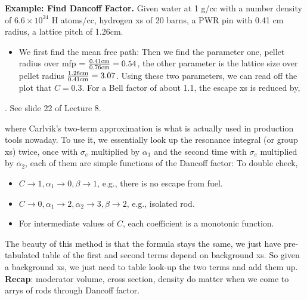 \documentclass{school-22.211-notes}
\begin{document}
\textbf{Example: Find Dancoff Factor.} Given water at 1 g/cc with a number density of $6.6 \times 10^{24}$ H atoms/cc, hydrogen xs of 20 barns, a PWR pin with 0.41 cm radius, a lattice pitch of 1.26cm. 
\begin{itemize}
\item We first find the mean free path: 
Then we find the parameter one, pellet radius over mfp = $\frac{0.41 \mathrm{cm}}{0.76 \mathrm{cm}}  = 0.54$, the other parameter is the lattice size over pellet radius $\frac{1.26 \mathrm{cm}}{0.41 \mathrm{cm}} = 3.07$. Using these two parameters, we can read off the plot that $C = 0.3$. For a Bell factor of about 1.1, the escape xs is reduced by,
\end{itemize}
. See slide 22 of Lecture 8. 


\clearpage
{}
where
Carlvik's two-term approximation is what is actually used in production tools nowaday. To use it, we essentially look up the resonance integral (or group xs) twice, once with $\sigma_e$ multiplied by $\alpha_1$ and the second time with $\sigma_e$ multiplied by $\alpha_2$, each of them are simple functions of the Dancoff factor: 
To double check, 
\begin{itemize}
\item $C\to 1, \alpha_1 \to 0, \beta \to 1$, e.g., there is no escape from fuel.
\item $C\to 0, \alpha_1 \to 2, \alpha_2 \to 3, \beta \to 2$, e.g., isolated rod.
\item For intermediate values of $C$, each coefficient is a monotonic function.
\end{itemize}
The beauty of this method is that the formula stays the same, we just have pre-tabulated table of the first and second terms depend on background xs. So given a background xs, we just need to table look-up the two terms and add them up. \\
\textbf{Recap}: moderator volume, cross section, density do matter when we come to arrys of rods through Dancoff factor.


\clearpage
\end{document}
